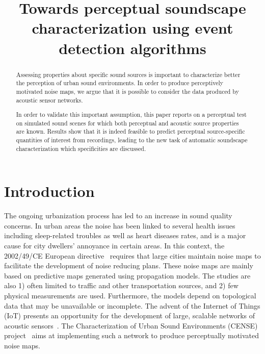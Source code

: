 \documentclass{article}
\title{Towards perceptual soundscape characterization using event detection algorithms}
\begin{document}
\ninept
\maketitle

\begin{sloppy}

\begin{abstract}
Assessing properties about specific sound sources is important to  characterize better the perception of urban sound environments. In order to produce perceptively motivated noise maps, we argue that it is possible to consider the data produced by acoustic sensor networks.

In order to validate this important assumption, this paper reports on a perceptual test on simulated sound scenes for which both perceptual and acoustic source properties are known. Results show that it is indeed feasible to predict perceptual source-specific quantities of interest from recordings, leading to the new task of automatic soundscape characterization which specificities are discussed.

\end{abstract}

\begin{keywords}
\end{keywords}

\section{Introduction}
\label{sec:intro}

The ongoing urbanization process has led to an increase in sound quality concerns. In urban areas the noise has been linked to several health issues including sleep-related troubles as well as heart diseases rates, and is a major cause for city dwellers' annoyance in certain areas. In this context, the 2002/49/CE European directive~\cite{ec2002} requires that large cities maintain noise maps to facilitate the development of noise reducing plans. These noise maps are mainly based on predictive maps generated using propagation models. The studies are also 1) often limited to traffic and other transportation sources, and 2) few physical measurements are used. Furthermore, the models depend on topological data that may be unavailable or incomplete. The advent of the Internet of Things (IoT) presents an opportunity for the development of large, scalable networks of acoustic sensors~\cite{mydlarz2017, gontier2017}. The Characterization of Urban Sound Environments (CENSE) project~\cite{picault2017} aims at implementing such a network to produce perceptually motivated noise maps.


\end{sloppy}
\end{document}
